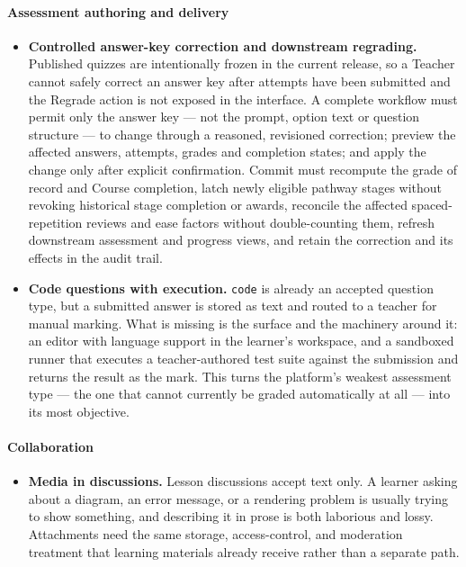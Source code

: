 \paragraph{Assessment authoring and delivery}
\begin{itemize}
    \item \textbf{Controlled answer-key correction and downstream regrading.} Published quizzes are intentionally frozen in the current release, so a Teacher cannot safely correct an answer key after attempts have been submitted and the Regrade action is not exposed in the interface. A complete workflow must permit only the answer key --- not the prompt, option text or question structure --- to change through a reasoned, revisioned correction; preview the affected answers, attempts, grades and completion states; and apply the change only after explicit confirmation. Commit must recompute the grade of record and Course completion, latch newly eligible pathway stages without revoking historical stage completion or awards, reconcile the affected spaced-repetition reviews and ease factors without double-counting them, refresh downstream assessment and progress views, and retain the correction and its effects in the audit trail.

    \item \textbf{Code questions with execution.} \texttt{code} is already an accepted question type, but a submitted answer is stored as text and routed to a teacher for manual marking. What is missing is the surface and the machinery around it: an editor with language support in the learner's workspace, and a sandboxed runner that executes a teacher-authored test suite against the submission and returns the result as the mark. This turns the platform's weakest assessment type --- the one that cannot currently be graded automatically at all --- into its most objective.
\end{itemize}

\paragraph{Collaboration}
\begin{itemize}
    \item \textbf{Media in discussions.} Lesson discussions accept text only. A learner asking about a diagram, an error message, or a rendering problem is usually trying to show something, and describing it in prose is both laborious and lossy. Attachments need the same storage, access-control, and moderation treatment that learning materials already receive rather than a separate path.
\end{itemize}

